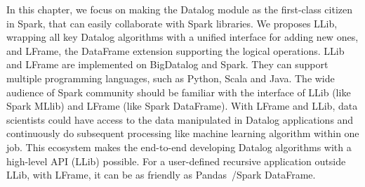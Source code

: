 In this chapter, we focus on making the Datalog module as the first-class citizen in Spark, that can easily collaborate with Spark libraries. We proposes LLib, wrapping all key Datalog algorithms with a unified interface for adding new ones, and LFrame, the DataFrame extension supporting the logical operations.  LLib and LFrame are implemented on BigDatalog and Spark. They can support multiple programming languages, such as Python, Scala and Java. The wide audience of Spark community should be familiar with the interface of LLib (like Spark MLlib) and LFrame (like Spark DataFrame). With LFrame and LLib, data scientists could have access to the data manipulated in Datalog applications and  continuously do subsequent processing like machine learning algorithm within one job. 
This ecosystem makes the end-to-end developing Datalog algorithms with a high-level API (LLib) possible. For a user-defined recursive application outside LLib, with LFrame, it can be as friendly as Pandas~\citep{mckinney2010data}/Spark DataFrame. 

